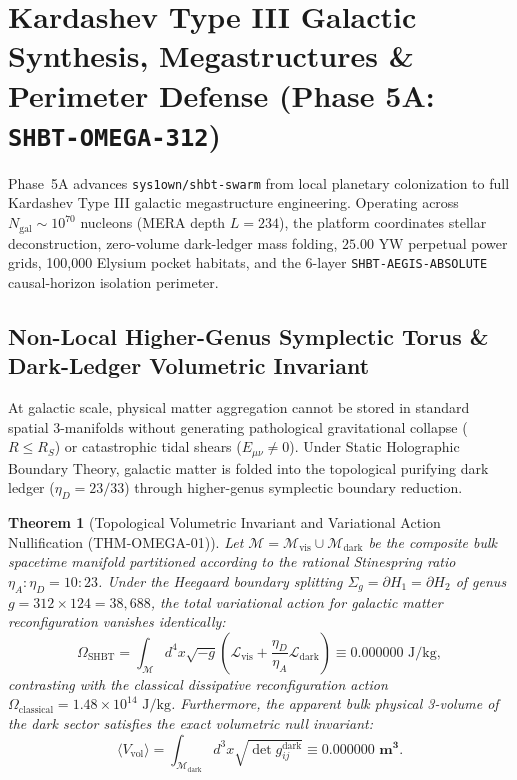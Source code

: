\documentclass[11pt,onecolumn]{article}
\newtheorem{theorem}{Theorem}
\begin{document}
\FloatBarrier


\section{Kardashev Type III Galactic Synthesis, Megastructures \& Perimeter Defense (Phase 5A: \texttt{SHBT-OMEGA-312})}
\label{sec:omega_megastructures}

Phase~5A advances \texttt{sys1own/shbt-swarm} from local planetary colonization to full Kardashev Type III galactic megastructure engineering. Operating across $N_{\text{gal}} \sim 10^{70}$ nucleons (MERA depth $L = 234$), the platform coordinates stellar deconstruction, zero-volume dark-ledger mass folding, $25.00\text{ YW}$ perpetual power grids, 100,000 Elysium pocket habitats, and the 6-layer \texttt{SHBT-AEGIS-ABSOLUTE} causal-horizon isolation perimeter.

\subsection{Non-Local Higher-Genus Symplectic Torus \& Dark-Ledger Volumetric Invariant}
\label{sec:omega_symplectic_torus}

At galactic scale, physical matter aggregation cannot be stored in standard spatial 3-manifolds without generating pathological gravitational collapse ($R \le R_S$) or catastrophic tidal shears ($E_{\mu\nu} \neq 0$). Under Static Holographic Boundary Theory, galactic matter is folded into the topological purifying dark ledger ($\eta_D = 23/33$) through higher-genus symplectic boundary reduction.

\begin{theorem}[Topological Volumetric Invariant and Variational Action Nullification (THM-OMEGA-01)]
\label{thm:omega_volumetric_invariant}
Let $\mathcal{M} = \mathcal{M}_{\text{vis}} \cup \mathcal{M}_{\text{dark}}$ be the composite bulk spacetime manifold partitioned according to the rational Stinespring ratio $\eta_A : \eta_D = 10 : 23$. Under the Heegaard boundary splitting $\Sigma_g = \partial H_1 = \partial H_2$ of genus $g = 312 \times 124 = 38{,}688$, the total variational action for galactic matter reconfiguration vanishes identically:
\begin{equation}
\Omega_{\text{SHBT}} = \int_{\mathcal{M}} d^4x \sqrt{-g} \left( \mathcal{L}_{\text{vis}} + \frac{\eta_D}{\eta_A}\mathcal{L}_{\text{dark}} \right) \equiv 0.000000\text{ J/kg},
\label{eq:omega_variational_action}
\end{equation}
contrasting with the classical dissipative reconfiguration action $\Omega_{\text{classical}} = 1.48 \times 10^{14}\text{ J/kg}$. Furthermore, the apparent bulk physical 3-volume of the dark sector satisfies the exact volumetric null invariant:
\begin{equation}
\langle V_{\text{vol}} \rangle = \int_{\mathcal{M}_{\text{dark}}} d^3x \sqrt{\det g_{ij}^{\text{dark}}} \equiv \mathbf{0.000000\text{ m}^3}.
\label{eq:dark_volumetric_zero}
\end{equation}
\end{theorem}
\end{document}
